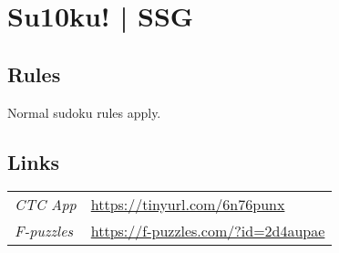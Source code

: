 \section[Su10ku! | SSG {[\emph{Classic Sudoku}]}]{Su10ku! | {\normalfont SSG}}
\label{sec:28-su10ku-ssg}

\subsection*{Rules}
\begin{markdown}
Normal sudoku rules apply.
\end{markdown}
\subsection*{Links}
\begin{tabularx}{\textwidth}{l X}
\emph{CTC App} & \url{https://tinyurl.com/6n76punx} \\
\emph{F-puzzles} & \url{https://f-puzzles.com/?id=2d4aupae} \\
\end{tabularx}
\pagebreak
